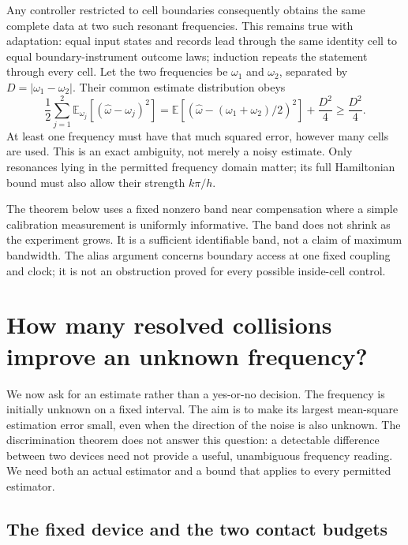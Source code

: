 \documentclass[11pt,a4paper]{article}
\numberwithin{equation}{section}
\theoremstyle{remark}
\newcommand{\E}{\mathbb E}
\begin{document}
Any controller restricted to cell boundaries consequently obtains the
same complete data at two such resonant frequencies. This remains true
with adaptation: equal input states and records lead through the same
identity cell to equal boundary-instrument outcome laws; induction repeats
the statement through every cell. Let the two frequencies be $\omega_1$
and $\omega_2$, separated by $D=|\omega_1-\omega_2|$. Their common estimate
distribution obeys
\begin{equation}
 \frac12\sum_{j=1}^2\E_{\omega_j}
       [(\widehat\omega-\omega_j)^2]
 =\E[(\widehat\omega-(\omega_1+\omega_2)/2)^2]+\frac{D^2}{4}
 \ge\frac{D^2}{4}.
\end{equation}
At least one frequency must have that much squared error, however many
cells are used. This is an exact ambiguity, not merely a noisy estimate.
Only resonances lying in the permitted frequency domain matter; its full
Hamiltonian bound must also allow their strength $k\pi/h$.

The theorem below uses a fixed nonzero band near compensation where a
simple calibration measurement is uniformly informative. The band does
not shrink as the experiment grows. It is a sufficient identifiable band,
not a claim of maximum bandwidth. The alias argument concerns boundary
access at one fixed coupling and clock; it is not an obstruction proved
for every possible inside-cell control.


\section{How many resolved collisions improve an unknown frequency?}
\label{con:task}

We now ask for an estimate rather than a yes-or-no decision. The frequency
is initially unknown on a fixed interval. The aim is to make its largest
mean-square estimation error small, even when the direction of the noise
is also unknown. The discrimination theorem does not answer this question:
a detectable difference between two devices need not provide a useful,
unambiguous frequency reading. We need both an actual estimator and a bound
that applies to every permitted estimator.

\subsection{The fixed device and the two contact budgets}
\end{document}
